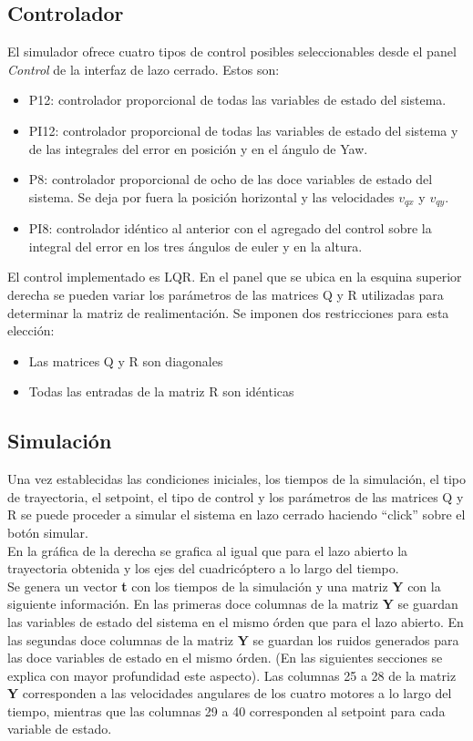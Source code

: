 \documentclass[main]{subfiles}
\begin{document}
\subsection*{Controlador}
El simulador ofrece cuatro tipos de control posibles seleccionables desde el panel \emph{Control} de la interfaz de lazo cerrado. Estos son:
\begin{itemize}
\item P12: controlador proporcional de todas las variables de estado del sistema.
\item PI12: controlador proporcional de todas las variables de estado del sistema y de las integrales del error en posici\'on y en el \'angulo de Yaw.
\item P8: controlador proporcional de ocho de las doce variables de estado del sistema. Se deja por fuera la posici\'on horizontal y las velocidades $v_{qx}$ y $v_{qy}$.
\item PI8: controlador id\'entico al anterior con el agregado del control sobre la integral del error en los tres \'angulos de euler y en la altura.
\end{itemize}

El control implementado es LQR. En el panel que se ubica en la esquina superior derecha se pueden variar los par\'ametros de las matrices Q y R utilizadas para determinar la matriz de realimentaci\'on. Se imponen dos restricciones para esta elecci\'on:
\begin{itemize}
\item Las matrices Q y R son diagonales
\item Todas las entradas de la matriz R son id\'enticas
\end{itemize}

\subsection*{Simulaci\'on}
Una vez establecidas las condiciones iniciales, los tiempos de la simulaci\'on, el tipo de trayectoria, el setpoint, el tipo de control y los par\'ametros de las matrices Q y R se puede proceder a simular el sistema en lazo cerrado haciendo ``click'' sobre el bot\'on simular.\\

En la gr\'afica de la derecha se grafica al igual que para el lazo abierto la trayectoria obtenida y los ejes del cuadric\'optero a lo largo del tiempo.\\

Se genera un vector \textbf{t} con los tiempos de la simulaci\'on y una matriz \textbf{Y} con la siguiente informaci\'on. En las primeras doce columnas de la matriz \textbf{Y} se guardan las variables de estado del sistema en el mismo \'orden que para el lazo abierto. En las segundas doce columnas de la matriz \textbf{Y} se guardan los ruidos generados para las doce variables de estado en el mismo \'orden. (En las siguientes secciones se explica con mayor profundidad este aspecto). Las columnas 25 a 28 de la matriz \textbf{Y} corresponden a las velocidades angulares de los cuatro motores a lo largo del tiempo, mientras que las columnas 29 a 40 corresponden al setpoint para cada variable de estado.\\
\end{document}
